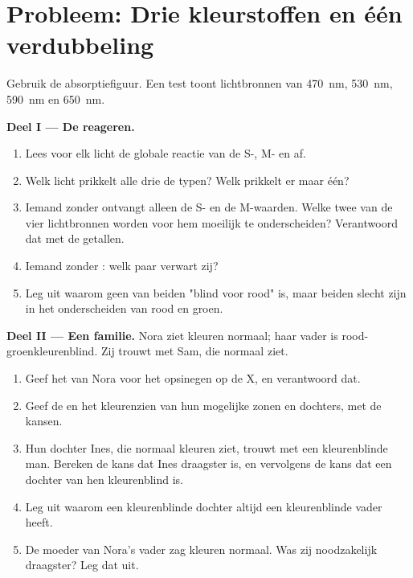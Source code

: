 \section{Probleem: Drie kleurstoffen en één verdubbeling}

\begin{problem}
\label{pb:g11:the-eye:1}
Gebruik de absorptiefiguur. Een test toont lichtbronnen van
\qty{470}{nm}, \qty{530}{nm}, \qty{590}{nm} en \qty{650}{nm}.

\medskip
\noindent\textbf{Deel I --- De  reageren.}
\begin{enumerate}
  \item Lees voor elk licht de globale reactie van de S-, M- en
         af.
  \item Welk licht prikkelt alle drie de typen? Welk prikkelt er maar
        één?
  \item Iemand zonder  ontvangt alleen de S- en de M-waarden.
        Welke twee van de vier lichtbronnen worden voor hem moeilijk te
        onderscheiden? Verantwoord dat met de getallen.
  \item Iemand zonder : welk paar verwart zij?
  \item Leg uit waarom geen van beiden "blind voor rood" is, maar beiden
        slecht zijn in het onderscheiden van rood en groen.
\end{enumerate}

\medskip
\noindent\textbf{Deel II --- Een familie.}
Nora ziet kleuren normaal; haar vader is rood-groenkleurenblind. Zij
trouwt met Sam, die normaal ziet.
\begin{enumerate}[resume]
  \item Geef het  van Nora voor het opsinegen op de X, en
        verantwoord dat.
  \item Geef de  en het kleurenzien van hun mogelijke zonen en
        dochters, met de kansen.
  \item Hun dochter Ines, die normaal kleuren ziet, trouwt met een
        kleurenblinde man. Bereken de kans dat Ines draagster is, en
        vervolgens de kans dat een dochter van hen kleurenblind is.
  \item Leg uit waarom een kleurenblinde dochter altijd een
        kleurenblinde vader heeft.
  \item De moeder van Nora's vader zag kleuren normaal. Was zij
        noodzakelijk draagster? Leg dat uit.
\end{enumerate}


\end{problem}
